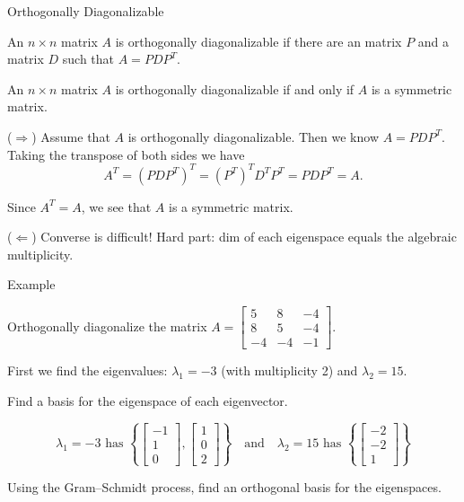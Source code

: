 \documentclass[xcolor=dvipsnames,aspectratio=169,t]{beamer}
\begin{document}
\begin{frame}{Orthogonally Diagonalizable}
  \begin{definition}
    An $n \times n$ matrix $A$ is \alert{orthogonally diagonalizable} if there are an  matrix $P$ and a  matrix $D$ such that $A = PDP^T$.
  \end{definition}

  \pause
  \begin{theorem}
  An $n \times n$ matrix $A$ is \alert{orthogonally diagonalizable} if and only if $A$ is a \alert{symmetric} matrix.
  \end{theorem}

  \pause
  \smallskip
  
  ($\Rightarrow$) Assume that $A$ is orthogonally diagonalizable. Then we know $A=PDP^T$.
  \pause
  Taking the transpose of both sides we have
  \vspace*{-.5em}
  \[ A^T = (PDP^T)^T = (P^T)^TD^TP^T = PDP^T = A.\]
  \vspace*{-1.75em}
  
  Since $A^T=A$, we see that $A$ is a symmetric matrix.
  \medskip

  \pause
  ($\Leftarrow$) Converse is \alert{difficult}!  Hard part: dim of each eigenspace equals the algebraic multiplicity.
  \hfill\blue{\qed}
\end{frame}


\begin{frame}{Example}
  \smallskip

  \alert{Orthogonally diagonalize} the matrix $A = \begin{bmatrix} 5 & 8 & -4 \\ 8 & 5 & -4 \\ -4 & -4 & -1 \end{bmatrix}$.
  \bigskip

  \pause
  \bb
  \ii First we find the eigenvalues: $\lambda_1 = -3$ (with multiplicity 2) and $\lambda_2 = 15$.
  \medskip

  \pause
  \ii Find a basis for the eigenspace of each eigenvector.

  \[ \lambda_1 = -3 \mbox{\ \ has \ \ } \left\{  \begin{bmatrix} -1 \\ 1 \\ 0 \end{bmatrix} , \begin{bmatrix} 1 \\ 0 \\ 2 \end{bmatrix} \right\} \quad \mbox{and} \quad \lambda_2 = 15 \mbox{\ \ has \ \ }  \left\{\begin{bmatrix} -2 \\ -2 \\ 1 \end{bmatrix}\right\} \]

  \pause
  \ii Using the Gram--Schmidt process, find an orthogonal basis for the eigenspaces.
  \ee

\end{frame}
\end{document}
